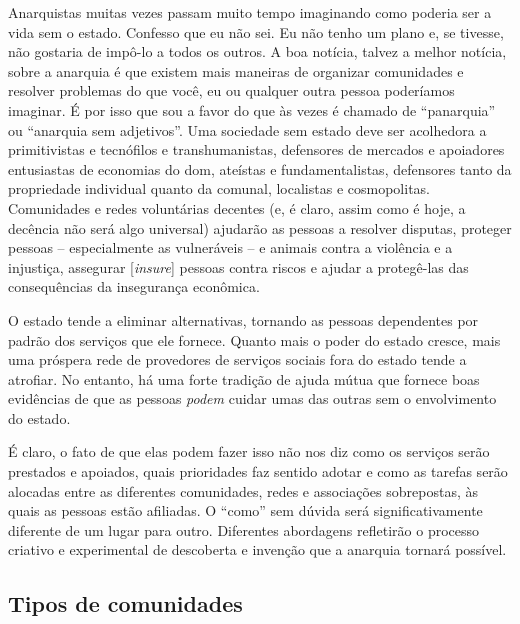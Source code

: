 Anarquistas muitas vezes passam muito tempo imaginando como poderia ser a vida sem o estado. Confesso que eu não sei. Eu não tenho um plano e, se tivesse, não gostaria de impô-lo a todos os outros. A boa notícia, talvez a melhor notícia, sobre a anarquia é que existem mais maneiras de organizar comunidades e resolver problemas do que você, eu ou qualquer outra pessoa poderíamos imaginar. É por isso que sou a favor do que às vezes é chamado de ``panarquia'' ou ``anarquia sem adjetivos''. Uma sociedade sem estado deve ser acolhedora a primitivistas e tecnófilos e transhumanistas, defensores de mercados e apoiadores entusiastas de economias do dom, ateístas e fundamentalistas, defensores tanto da propriedade individual quanto da comunal, localistas e cosmopolitas. Comunidades e redes voluntárias decentes (e, é claro, assim como é hoje, a decência não será algo universal) ajudarão as pessoas a resolver disputas, proteger pessoas -- especialmente as vulneráveis -- e animais contra a violência e a injustiça, assegurar [\emph{insure}] pessoas contra riscos e ajudar a protegê-las das consequências da insegurança econômica.

O estado tende a eliminar alternativas, tornando as pessoas dependentes por padrão dos serviços que ele fornece. Quanto mais o poder do estado cresce, mais uma próspera rede de provedores de serviços sociais fora do estado tende a atrofiar. No entanto, há uma forte tradição de ajuda mútua que fornece boas evidências de que as pessoas \emph{podem} cuidar umas das outras sem o envolvimento do estado.

É claro, o fato de que elas podem fazer isso não nos diz como os serviços serão prestados e apoiados, quais prioridades faz sentido adotar e como as tarefas serão alocadas entre as diferentes comunidades, redes e associações sobrepostas, às quais as pessoas estão afiliadas. O ``como'' sem dúvida será significativamente diferente de um lugar para outro. Diferentes abordagens refletirão o processo criativo e experimental de descoberta e invenção que a anarquia tornará possível.

\subsection*{Tipos de comunidades}


